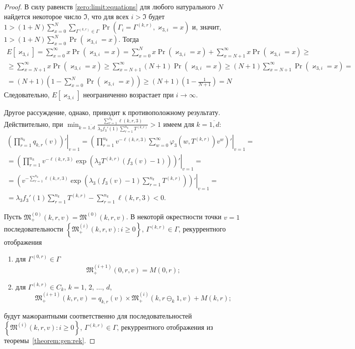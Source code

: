 \documentclass[a4paper,12pt,russian]{extarticle}
\begin{document}
\begin{proof}
В силу равенств \eqref{zero:limit:equations} для любого натурального $N$ найдется некоторое число $\mathfrak{I}$, что для всех $i > \mathfrak{I}$ будет
$1 > (1+N) \sum_{x=0}^{N} \sum_{\Gamma^{(k,r)}\in \Gamma}  \Pr(\Gamma_{i}=\Gamma^{(k,r)}, \varkappa_{3,i}=x)$ и, значит, $1 > (1+N) \sum_{x=0}^{N}  \Pr(\varkappa_{3,i}=x)$. Тогда
\begin{multline*}
E[\varkappa_{3,i}] = \sum_{x=0}^{\infty} x \Pr(\varkappa_{3,i}=x) = \sum_{x=0}^{N} x \Pr(\varkappa_{3,i}=x) + \sum_{x=N+1}^{\infty} x \Pr(\varkappa_{3,i}=x) \geqslant \\ \geqslant  \sum_{x=N+1}^{\infty} x \Pr(\varkappa_{3,i}=x) \geqslant \sum_{x=N+1}^{\infty} (N+1)
\Pr(\varkappa_{3,i}=x) \geqslant (N+1) \sum_{x=N+1}^{\infty} \Pr( \varkappa_{3,i}=x) =\\ =  (N+1) \left(1 - \sum_{x=0}^{N} \Pr(\varkappa_{3,i}=x)\right) \geqslant (N+1) \left(1 - \frac{1}{N+1}\right) = N
\end{multline*}
Следовательно, $E[\varkappa_{3,i}]$ неограниченно возрастает при $i \to \infty$. 

Другое рассуждение, однако, приводит к противоположному результату. Действительно, при $\min_{k=\overline{1,d}} { \frac{\sum_{r = 1}^{n_k} \ell(k,r,3) }{\lambda_3 f_3'(1) \sum_{r=1}^{n_k} T^{(k,r)} }}>1$ имеем для $k=\overline{1,d}$:
\begin{multline}
 \left.\left(\prod_{r=1}^{n_k}q_{k,r}(v)\right) ' \right|_{v=1} = 
  \left.\left(\prod_{r=1}^{n_k}v^{-\ell(k,r,3)}\sum_{w=0}^{\infty} \varphi_3(w,T^{(k,r)})v^w \right) ' \right|_{v=1} = \\ =
   \left.\left(\prod_{r=1}^{n_k} v^{-\ell(k,r,3)}\exp(\lambda_3 T^{(k,r)} (f_3(v)-1))\right) ' \right|_{v=1} = \\ =
    \left.\left(v^{-\sum_{r=1}^{n_k}\ell(k,r,3)}\exp(\lambda_3 (f_3(v)-1)\sum_{r=1}^{n_k} T^{(k,r)}) \right) ' \right|_{v=1} = \\ =
\lambda_3 f_3'(1) \sum_{r=1}^{n_k} T^{(k,r)} -\sum_{r=1}^{n_k} \ell(k,r,3)  < 0.
\label{derivative:cycle}
\end{multline}

Пусть $\mathfrak{M}_+^{(0)}(k,r,v) =\mathfrak{M}^{(0)}(k,r,v)$. В некоторй окрестности точки  $v = 1$  последовательности $\left\{\mathfrak{M}_+^{(i)}(k,r,v)\colon i \geqslant 0\right\}$, $\Gamma^{(k,r)} \in \Gamma$, рекуррентного отображения 
\begin{enumerate}
\item для $ \Gamma^{(0,r)} \in \Gamma$ $$\mathfrak{M}_+^{(i+1)}(0,r,v) = M(0,r);$$
\item для $\Gamma^{(k, r)} \in C_{k}$,  $k=1$, $2$, $\dots$, $d$,
$$\mathfrak{M}_+^{(i+1)}(k,r,v) = q_{k,r} (v)\times  \mathfrak{M}_+^{(i)}(k,r \ominus_{k} 1,v) + M(k,r);$$
\end{enumerate}
будут мажорантными соответственно для последовательностей $\left\{\mathfrak{M}^{(i)}(k,r,v)\colon i \geqslant 0\right\}$, $\Gamma^{(k,r)} \in \Gamma$, рекуррентного отображения из теоремы~\ref{theorem:gen:rek}.


\end{proof}
\end{document}
